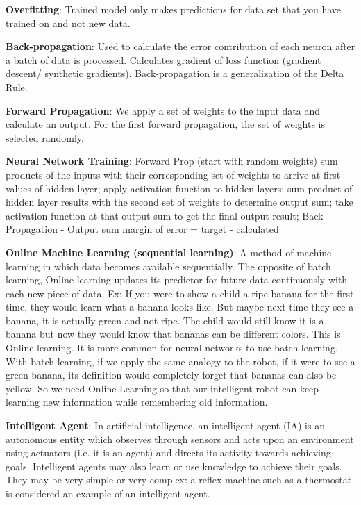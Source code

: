 \documentclass[draftclsnofoot, onecolumn, 10pt, compsoc]{IEEEtran}
\begin{document}
		\noindent\textbf{Overfitting}: Trained model only makes predictions for data set that you have trained on and not new data.
		
		\noindent\textbf{Back-propagation}: Used to calculate the error contribution of each neuron after a batch of data is processed. Calculates gradient of loss function (gradient descent/ synthetic gradients). Back-propagation is a generalization of the Delta Rule.
		
		\noindent\textbf{Forward Propagation}: We apply a set of weights to the input data and calculate an output. For the first forward propagation, the set of weights is selected randomly.
		
		\noindent\textbf{Neural Network Training}: Forward Prop (start with random weights) sum products of the inputs with their corresponding set of weights to arrive at first values of hidden layer; apply activation function to hidden layers; sum product of hidden layer results with the second set of weights to determine output sum; take activation function at that output sum to get the final output result; Back Propagation \cite{neuralnets} \newline
				- Output sum margin of error = target - calculated
		
		\noindent\textbf{Online Machine Learning (sequential learning)}: A method of machine learning in which data becomes available sequentially. The opposite of batch learning, Online learning updates its predictor for future data continuously with each new piece of data. Ex: If you were to show a child a ripe banana for the first time, they would learn what a banana looks like. But maybe next time they see a banana, it is actually green and not ripe. The child would still know it is a banana but now they would know that bananas can be different colors. This is Online learning. It is more common for neural networks to use batch learning. With batch learning, if we apply the same analogy to the robot, if it were to see a green banana, its definition would completely forget that bananas can also be yellow. So we need Online Learning so that our intelligent robot can keep learning new information while remembering old information.
		
		\noindent\textbf{Intelligent Agent}: In artificial intelligence, an intelligent agent (IA) is an autonomous entity which observes through sensors and acts upon an environment using actuators (i.e. it is an agent) and directs its activity towards achieving goals. Intelligent agents may also learn or use knowledge to achieve their goals. They may be very simple or very complex: a reflex machine such as a thermostat is considered an example of an intelligent agent.
		\cite{Norvig}
		
\end{document}
